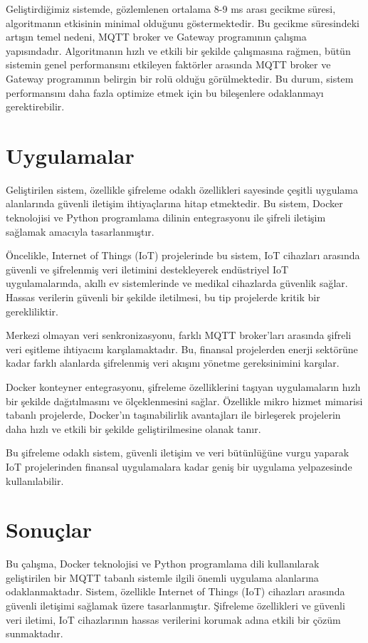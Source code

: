\documentclass[conference, a4paper]{IEEEtran}
\begin{document}
    Geliştirdiğimiz sistemde, gözlemlenen ortalama 8-9 ms arası gecikme süresi, algoritmanın etkisinin minimal olduğunu göstermektedir. Bu gecikme süresindeki artışın temel nedeni, MQTT broker ve Gateway programının çalışma yapısındadır. Algoritmanın hızlı ve etkili bir şekilde çalışmasına rağmen, bütün sistemin genel performansını etkileyen faktörler arasında MQTT broker ve Gateway programının belirgin bir rolü olduğu görülmektedir. Bu durum, sistem performansını daha fazla optimize etmek için bu bileşenlere odaklanmayı gerektirebilir.
    
    \section{Uygulamalar}
    Geliştirilen sistem, özellikle şifreleme odaklı özellikleri sayesinde çeşitli uygulama alanlarında güvenli iletişim ihtiyaçlarına hitap etmektedir. Bu sistem, Docker teknolojisi ve Python programlama dilinin entegrasyonu ile şifreli iletişim sağlamak amacıyla tasarlanmıştır.
    
    Öncelikle, Internet of Things (IoT) projelerinde bu sistem, IoT cihazları arasında güvenli ve şifrelenmiş veri iletimini destekleyerek endüstriyel IoT uygulamalarında, akıllı ev sistemlerinde ve medikal cihazlarda güvenlik sağlar. Hassas verilerin güvenli bir şekilde iletilmesi, bu tip projelerde kritik bir gerekliliktir.

    Merkezi olmayan veri senkronizasyonu, farklı MQTT broker'ları arasında şifreli veri eşitleme ihtiyacını karşılamaktadır. Bu, finansal projelerden enerji sektörüne kadar farklı alanlarda şifrelenmiş veri akışını yönetme gereksinimini karşılar.

    Docker konteyner entegrasyonu, şifreleme özelliklerini taşıyan uygulamaların hızlı bir şekilde dağıtılmasını ve ölçeklenmesini sağlar. Özellikle mikro hizmet mimarisi tabanlı projelerde, Docker'ın taşınabilirlik avantajları ile birleşerek projelerin daha hızlı ve etkili bir şekilde geliştirilmesine olanak tanır.

    Bu şifreleme odaklı sistem, güvenli iletişim ve veri bütünlüğüne vurgu yaparak IoT projelerinden finansal uygulamalara kadar geniş bir uygulama yelpazesinde kullanılabilir.

    \section{Sonuçlar}
    Bu çalışma, Docker teknolojisi ve Python programlama dili kullanılarak geliştirilen bir MQTT tabanlı sistemle ilgili önemli uygulama alanlarına odaklanmaktadır. Sistem, özellikle Internet of Things (IoT) cihazları arasında güvenli iletişimi sağlamak üzere tasarlanmıştır. Şifreleme özellikleri ve güvenli veri iletimi, IoT cihazlarının hassas verilerini korumak adına etkili bir çözüm sunmaktadır.
\end{document}
